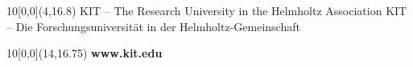 \begin{titlepage}
\vspace{1cm}

\begin{center}
{\color{red} \frontmatterhint}
\end{center}

\vspace{2cm}
\begin{center}
\large{\timeandplace}
\end{center}


\begin{textblock}{10}[0,0](4,16.8)
\tiny{
		{KIT -- The Research University in the Helmholtz Association}
		{KIT -- Die Forschungsuniversit\"at in der Helmholtz-Gemeinschaft}
}
\end{textblock}

\begin{textblock}{10}[0,0](14,16.75)
\large{
	\textbf{www.kit.edu}
}
\end{textblock}

\end{titlepage}
